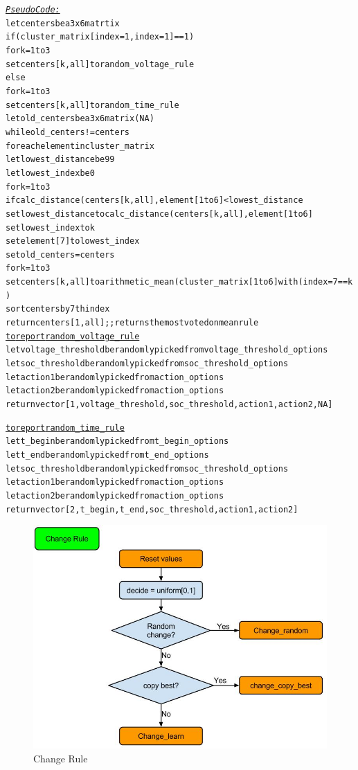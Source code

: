 \documentclass[a4paper]{article}
\begin{document}
\begin{alltt}
 \underline{\textit{Pseudo Code:}}
let centers be a 3x6 matrtix
if (cluster_matrix[index = 1, index =1] ==1)
for k = 1 to 3
        set centers[k,all] to random_voltage_rule
else 
    for k = 1 to 3 
        set centers[k,all] to random_time_rule
let old_centers be a 3x6 matrix (NA)
while old_centers != centers
    foreach element in cluster_matrix 
        let lowest_distance be 99 
        let lowest_index be 0
        for k = 1 to 3 
            if calc_distance(centers[k,all],element[1 to 6] < lowest_distance
                set lowest_distance to calc_distance(centers[k,all],element[1 to 6]
                set lowest_index to k 
        set element[7] to lowest_index
    set old_centers = centers
for k = 1 to 3 
    set centers[k,all] to arithmetic_mean(cluster_matrix[1 to 6] with (index = 7 ==k)
sort centers by 7th index
return centers[1, all] ;; returns the most voted on mean rule
\underline{to report random_voltage_rule}
let voltage_threshold be randomly picked from voltage_threshold_options
    let soc_threshold be randomly picked from soc_threshold_options
    let action1 be randomly picked from action_options
    let action2 be randomly picked from action_options
    return vector[1,voltage_threshold,soc_threshold,action1,action2,NA]

\underline{to report random_time_rule} 
let t_begin be randomly picked from t_begin_options
    let t_end be randomly picked from t_end_options
    let soc_threshold be randomly picked from soc_threshold_options
    let action1 be randomly picked from action_options
    let action2 be randomly picked from action_options
    return vector[2,t_begin,t_end,soc_threshold,action1,action2]
\end{alltt}
\newpage
\begin{figure}[!ht]
\includegraphics[width =\textwidth]{change_rule.jpg}
\caption{Change Rule}
\label{change_rule}
\end{figure}
\end{document}
